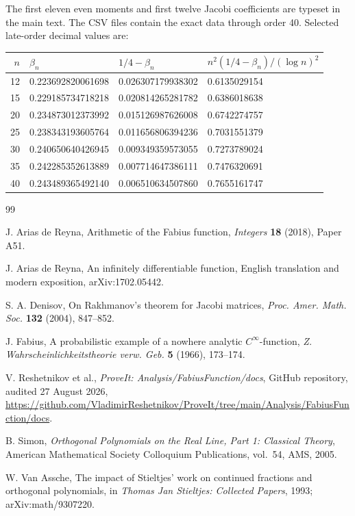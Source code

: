 \documentclass[11pt]{article}
\theoremstyle{definition}
\theoremstyle{remark}
\begin{document}
The first eleven even moments and first twelve Jacobi coefficients are typeset in the main
text.  The CSV files contain the exact data through order 40.  Selected late-order decimal
values are:
\begin{center}
\begin{tabular}{rlll}
\toprule
\(n\) & \(\beta_n\) & \(1/4-\beta_n\) &
\(n^2(1/4-\beta_n)/(\log n)^2\) \\
\midrule
12 & 0.223692820061698 & 0.026307179938302 & 0.6135029154 \\
15 & 0.229185734718218 & 0.020814265281782 & 0.6386018638 \\
20 & 0.234873012373992 & 0.015126987626008 & 0.6742274757 \\
25 & 0.238343193605764 & 0.011656806394236 & 0.7031551379 \\
30 & 0.240650640426945 & 0.009349359573055 & 0.7273789024 \\
35 & 0.242285352613889 & 0.007714647386111 & 0.7476320691 \\
40 & 0.243489365492140 & 0.006510634507860 & 0.7655161747 \\
\bottomrule
\end{tabular}
\end{center}

\begin{thebibliography}{99}

J. Arias de Reyna,
\newblock Arithmetic of the Fabius function,
\newblock \emph{Integers} \textbf{18} (2018), Paper A51.

J. Arias de Reyna,
\newblock An infinitely differentiable function,
\newblock English translation and modern exposition, arXiv:1702.05442.

S. A. Denisov,
\newblock On Rakhmanov's theorem for Jacobi matrices,
\newblock \emph{Proc. Amer. Math. Soc.} \textbf{132} (2004), 847--852.

J. Fabius,
\newblock A probabilistic example of a nowhere analytic \(C^\infty\)-function,
\newblock \emph{Z. Wahrscheinlichkeitstheorie verw. Geb.} \textbf{5} (1966), 173--174.

V. Reshetnikov et al.,
\newblock \emph{ProveIt: Analysis/FabiusFunction/docs},
\newblock GitHub repository, audited 27 August 2026,
\newblock \url{https://github.com/VladimirReshetnikov/ProveIt/tree/main/Analysis/FabiusFunction/docs}.

B. Simon,
\newblock \emph{Orthogonal Polynomials on the Real Line, Part 1: Classical Theory},
\newblock American Mathematical Society Colloquium Publications, vol.~54, AMS, 2005.

W. Van Assche,
\newblock The impact of Stieltjes' work on continued fractions and orthogonal polynomials,
\newblock in \emph{Thomas Jan Stieltjes: Collected Papers}, 1993; arXiv:math/9307220.

\end{thebibliography}
\end{document}
